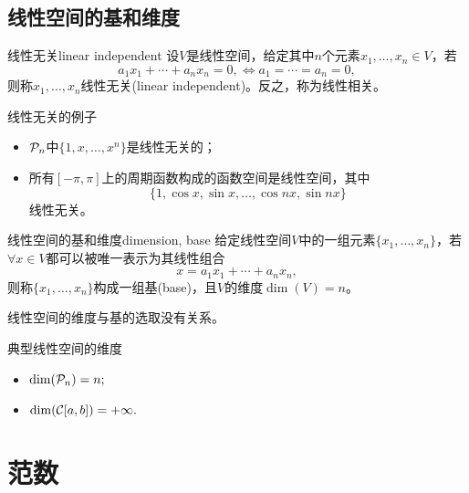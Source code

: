 \subsection{线性空间的基和维度}

\begin{definition}
    {线性无关}{linear independent}
    设$V$是线性空间，给定其中$n$个元素$x_1,\ldots,x_n\in V$，若%
    \begin{equation}
        a_1x_1+\cdots+a_nx_n=0,\iff a_1=\cdots=a_n=0,
    \end{equation}
    则称$x_1,\ldots,x_n$线性无关(linear independent)。反之，称为线性相关。
\end{definition}

\begin{example}
    {线性无关的例子}{}
    \begin{itemize}
        \item $\mathcal P_n$中$\{1,x,\ldots,x^n\}$是线性无关的；
        \item 所有$[-\pi,\pi]$上的周期函数构成的函数空间是线性空间，其中
        \[
            \{1,\cos x,\sin x,\ldots,\cos nx,\sin nx\} 
        \]
        线性无关。
    \end{itemize}
\end{example}

\begin{definition}
    {线性空间的基和维度}{dimension, base}
    给定线性空间$V$中的一组元素$\{x_1,\ldots,x_n\}$，若$\forall x\in V$都可以被唯一表示为其线性组合
    \begin{equation}
        x=a_1x_1+\cdots+a_nx_n,
    \end{equation}
    则称$\{x_1,\ldots,x_n\}$构成一组基(base)，且$V$的维度$\dim(V)=n$。
\end{definition}

\begin{theorem}
    {}{}
    线性空间的维度与基的选取没有关系。
\end{theorem}

\begin{example}
    {典型线性空间的维度}{}
    \begin{itemize}
        \item $\dim(\mathcal P_n)=n;$
        \item $\dim(\mathcal C[a,b])=+\infty.$
    \end{itemize}
\end{example}

\section{范数}
\label{sec:norm}

